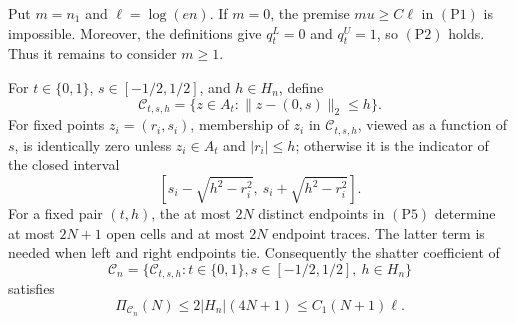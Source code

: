 Put \(m=n_1\) and \(\ell=\log(en)\).  If \(m=0\), the premise
\(mu\geq C\ell\) in \((\mathrm{P1})\) is impossible.  Moreover, the
definitions give \(q_t^L=0\) and \(q_t^U=1\), so \((\mathrm{P2})\) holds.
Thus it remains to consider \(m\geq1\).

For \(t\in\{0,1\}\), \(s\in[-1/2,1/2]\), and \(h\in H_n\), define
\[
 \mathcal C_{t,s,h}
 =\{z\in A_t:\|z-(0,s)\|_2\leq h\}.
 \tag{P4}
\]
For fixed points \(z_i=(r_i,s_i)\), membership of \(z_i\) in
\(\mathcal C_{t,s,h}\), viewed as a function of \(s\), is identically zero
unless \(z_i\in A_t\) and \(|r_i|\leq h\); otherwise it is the indicator of
the closed interval
\[
 [s_i-\sqrt{h^2-r_i^2},\ s_i+\sqrt{h^2-r_i^2}].
 \tag{P5}
\]
For a fixed pair \((t,h)\), the at most \(2N\) distinct endpoints in
\((\mathrm{P5})\) determine at most \(2N+1\) open cells and at most \(2N\)
endpoint traces.  The latter term is needed when left and right endpoints
tie.  Consequently the shatter coefficient of
\[
 \mathcal C_n=\{\mathcal C_{t,s,h}:t\in\{0,1\},
 s\in[-1/2,1/2],\ h\in H_n\}
\]
satisfies
\[
 \Pi_{\mathcal C_n}(N)
 \leq2|H_n|(4N+1)\leq C_1(N+1)\ell .
 \tag{P6}
\]

